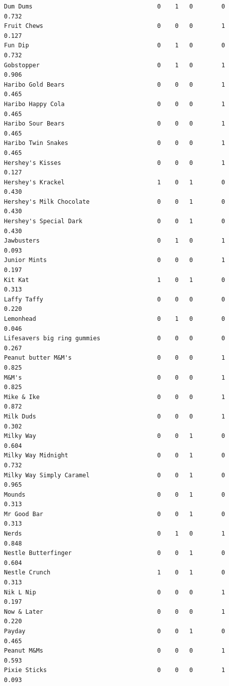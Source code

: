 \documentclass[
  letterpaper,
  DIV=11,
  numbers=noendperiod]{scrartcl}
\begin{document}
\begin{verbatim}
Dum Dums                                   0    1   0        0        0.732
Fruit Chews                                0    0   0        1        0.127
Fun Dip                                    0    1   0        0        0.732
Gobstopper                                 0    1   0        1        0.906
Haribo Gold Bears                          0    0   0        1        0.465
Haribo Happy Cola                          0    0   0        1        0.465
Haribo Sour Bears                          0    0   0        1        0.465
Haribo Twin Snakes                         0    0   0        1        0.465
Hershey's Kisses                           0    0   0        1        0.127
Hershey's Krackel                          1    0   1        0        0.430
Hershey's Milk Chocolate                   0    0   1        0        0.430
Hershey's Special Dark                     0    0   1        0        0.430
Jawbusters                                 0    1   0        1        0.093
Junior Mints                               0    0   0        1        0.197
Kit Kat                                    1    0   1        0        0.313
Laffy Taffy                                0    0   0        0        0.220
Lemonhead                                  0    1   0        0        0.046
Lifesavers big ring gummies                0    0   0        0        0.267
Peanut butter M&M's                        0    0   0        1        0.825
M&M's                                      0    0   0        1        0.825
Mike & Ike                                 0    0   0        1        0.872
Milk Duds                                  0    0   0        1        0.302
Milky Way                                  0    0   1        0        0.604
Milky Way Midnight                         0    0   1        0        0.732
Milky Way Simply Caramel                   0    0   1        0        0.965
Mounds                                     0    0   1        0        0.313
Mr Good Bar                                0    0   1        0        0.313
Nerds                                      0    1   0        1        0.848
Nestle Butterfinger                        0    0   1        0        0.604
Nestle Crunch                              1    0   1        0        0.313
Nik L Nip                                  0    0   0        1        0.197
Now & Later                                0    0   0        1        0.220
Payday                                     0    0   1        0        0.465
Peanut M&Ms                                0    0   0        1        0.593
Pixie Sticks                               0    0   0        1        0.093

\end{verbatim}
\end{document}
